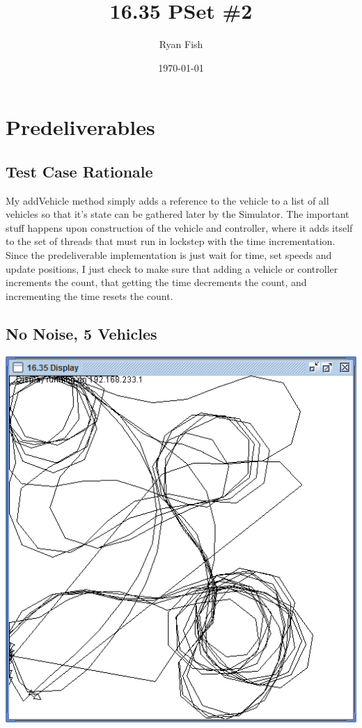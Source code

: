 \documentclass{article}
\title{16.35 PSet \#2}
\author{Ryan Fish}
\date{\today}
\begin{document}
\maketitle

\section{Predeliverables}
\subsection{Test Case Rationale}

My addVehicle method simply adds a reference to the vehicle to a list of all vehicles so that it's state can be gathered later by the Simulator.  The important stuff happens upon construction of the vehicle and controller, where it adds itself to the set of threads that must run in lockstep with the time incrementation.  Since the predeliverable implementation is just wait for time, set speeds and update positions, I just check to make sure that adding a vehicle or controller increments the count, that getting the time decrements the count, and incrementing the time resets the count.

\subsection{No Noise, 5 Vehicles}

\begin{center}
\includegraphics[width=0.7\linewidth]{5nonoise}
\end{center}
\end{document}

